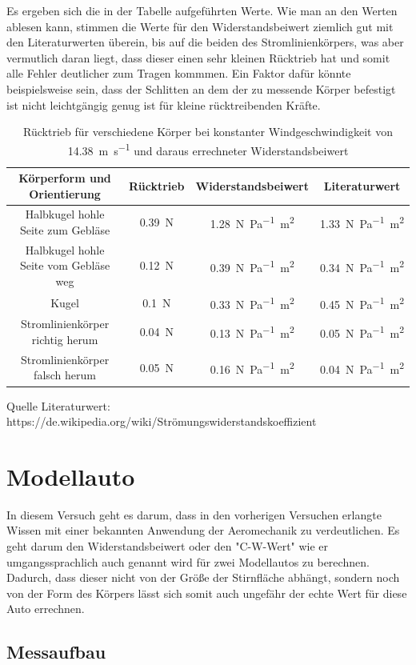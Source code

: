 Es ergeben sich die in der Tabelle aufgeführten Werte. Wie man an den Werten ablesen kann, stimmen die Werte für den Widerstandsbeiwert ziemlich gut mit den Literaturwerten überein, bis auf die beiden des Stromlinienkörpers, was aber vermutlich daran liegt, dass dieser einen sehr kleinen Rücktrieb hat und somit alle Fehler deutlicher zum Tragen kommmen. Ein Faktor dafür könnte beispielsweise sein, dass der Schlitten an dem der zu messende Körper befestigt ist nicht leichtgängig genug ist für kleine rücktreibenden Kräfte.

\begin{table}[]
    \caption{Rücktrieb für verschiedene Körper bei konstanter Windgeschwindigkeit von  \SI{14.38}{\metre\per\second} und daraus errechneter Widerstandsbeiwert}
    \centering
    \begin{tabular}{c c c c}
    \hline
    Körperform und Orientierung & Rücktrieb & Widerstandsbeiwert & Literaturwert\\
    \hline
    Halbkugel hohle Seite zum Gebläse   &   \SI{0.39}{\newton} & \SI{1.28}{\newton\per\pascal\square\metre} & \SI{1.33}{\newton\per\pascal\square\metre}  \\[5pt]
    Halbkugel hohle Seite vom Gebläse weg   &   \SI{0.12}{\newton} & \SI{0.39}{\newton\per\pascal\square\metre} &\SI{0.34}{\newton\per\pascal\square\metre}\\[5pt]
    Kugel & \SI{0.1}{\newton} & \SI{0.33}{\newton\per\pascal\square\metre} &\SI{0.45}{\newton\per\pascal\square\metre}\\[5pt]
    Stromlinienkörper richtig herum & \SI{0.04}{\newton} & \SI{0.13}{\newton\per\pascal\square\metre} & \SI{0.05}{\newton\per\pascal\square\metre}\\[5pt]
    Stromlinienkörper falsch herum & \SI{0.05}{\newton} & \SI{0.16}{\newton\per\pascal\square\metre} & \SI{0.04}{\newton\per\pascal\square\metre}\\[5pt]
    \hline
    \end{tabular}
    \label{tab:Versuch 2.3}
    Quelle Literaturwert: https://de.wikipedia.org/wiki/Strömungswiderstandskoeffizient
\end{table}

\section{Modellauto}

In diesem Versuch geht es darum, dass in den vorherigen Versuchen erlangte Wissen mit einer bekannten Anwendung der Aeromechanik zu verdeutlichen. Es geht darum den Widerstandsbeiwert oder den "C-W-Wert"  wie er umgangssprachlich auch genannt wird für zwei Modellautos zu berechnen. Dadurch, dass dieser nicht von der Größe der Stirnfläche abhängt, sondern noch von der Form des Körpers lässt sich somit auch ungefähr der echte Wert für diese Auto errechnen. 

\subsection{Messaufbau}